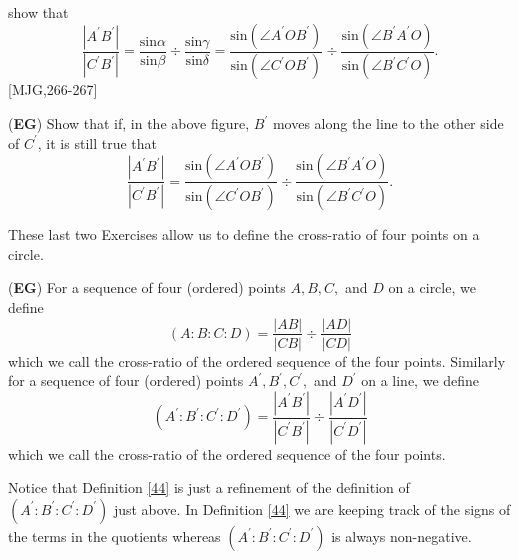 show that%
\[
\frac{\left\vert A^{\prime}B^{\prime}\right\vert }{\left\vert C^{\prime
}B^{\prime}\right\vert }=\frac{\mathrm{sin}\alpha}{\mathrm{sin}\beta}\div
\frac{\mathrm{sin}\gamma}{\mathrm{sin}\delta}=\frac{\mathrm{sin}\left(  \angle
A^{\prime}OB^{\prime}\right)  }{\mathrm{sin}\left(  \angle C^{\prime
}OB^{\prime}\right)  }\div\frac{\mathrm{sin}\left(  \angle B^{\prime}%
A^{\prime}O\right)  }{\mathrm{sin}\left(  \angle B^{\prime}C^{\prime}O\right)
}.
\]
[MJG,266-267]

\begin{exercise}
\label{49}(\textbf{EG}) Show that if, in the above figure, $B^{\prime}$ moves
along the line to the other side of $C^{\prime}$, it is still true that%
\[
\frac{\left\vert A^{\prime}B^{\prime}\right\vert }{\left\vert C^{\prime
}B^{\prime}\right\vert }=\frac{\mathrm{sin}\left(  \angle A^{\prime}%
OB^{\prime}\right)  }{\mathrm{sin}\left(  \angle C^{\prime}OB^{\prime}\right)
}\div\frac{\mathrm{sin}\left(  \angle B^{\prime}A^{\prime}O\right)
}{\mathrm{sin}\left(  \angle B^{\prime}C^{\prime}O\right)  }.
\]

\end{exercise}

These last two Exercises allow us to define the cross-ratio of four points on
a circle.

\begin{definition}
(\textbf{EG}) For a sequence of four (ordered) points $A,B,C,$ and $D$ on a
circle, we define%
\[
\left(  A:B:C:D\right)  =\frac{\left\vert AB\right\vert }{\left\vert
CB\right\vert }\div\frac{\left\vert AD\right\vert }{\left\vert CD\right\vert }%
\]
which we call the cross-ratio of the ordered sequence of the four points.
Similarly for a sequence of four (ordered) points $A^{\prime},B^{\prime
},C^{\prime},$ and $D^{\prime}$ on a line, we define%
\[
\left(  A^{\prime}:B^{\prime}:C^{\prime}:D^{\prime}\right)  =\frac{\left\vert
A^{\prime}B^{\prime}\right\vert }{\left\vert C^{\prime}B^{\prime}\right\vert
}\div\frac{\left\vert A^{\prime}D^{\prime}\right\vert }{\left\vert C^{\prime
}D^{\prime}\right\vert }%
\]
which we call the cross-ratio of the ordered sequence of the four points.
\end{definition}

Notice that Definition \ref{44} is just a refinement of the definition of
$\left(  A^{\prime}:B^{\prime}:C^{\prime}:D^{\prime}\right)  $ just above. In
Definition \ref{44} we are keeping track of the signs of the terms in the
quotients whereas $\left(  A^{\prime}:B^{\prime}:C^{\prime}:D^{\prime}\right)
$ is always non-negative.

